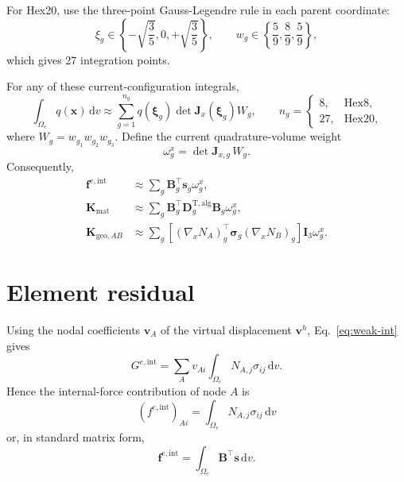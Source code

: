 \documentclass[11pt,a4paper]{article}
\newcommand{\bs}[1]{\boldsymbol{#1}}
\newcommand{\dd}{\mathrm{d}}
\newcommand{\sig}{\bs{\sigma}}
\newcommand{\vct}[1]{\mathbf{#1}}
\begin{document}
For Hex20, use the three-point Gauss-Legendre rule in each parent coordinate:
\begin{equation}
\xi_g\in\left\{-\sqrt{\frac{3}{5}},0,+\sqrt{\frac{3}{5}}\right\},
\qquad
w_g\in\left\{\frac{5}{9},\frac{8}{9},\frac{5}{9}\right\},
\end{equation}
which gives 27 integration points.

For any of these current-configuration integrals,
\begin{equation}
\int_{\Omega_e}q(\bs{x})\,\dd v
\approx
\sum_{g=1}^{n_g}
q(\bs{\xi}_g)
\det\vct{J}_x(\bs{\xi}_g)
W_g,
\qquad
n_g=\begin{cases}8,&\text{Hex8},\\27,&\text{Hex20},\end{cases}
\label{eq:quadrature}
\end{equation}
where $W_g=w_{g_1}w_{g_2}w_{g_3}$. Define the current quadrature-volume weight
\begin{equation}
\boxed{\omega_g^x=\det\vct J_{x,g}\,W_g.}
\label{eq:omega-current}
\end{equation}
Consequently,
\begin{align}
\vct f^{e,\mathrm{int}}
&\approx
\sum_g
\vct{B}_g^\top\vct{s}_g
\omega_g^x,
\label{eq:fint-quad}
\\
\vct{K}_{\mathrm{mat}}
&\approx
\sum_g
\vct{B}_g^\top\vct{D}^{\mathrm{T,alg}}_g\vct{B}_g
\omega_g^x,
\label{eq:Kmat-quad}
\\
\vct{K}_{\mathrm{geo},AB}
&\approx
\sum_g
\left[(\nabla_xN_A)_g^\top\sig_g(\nabla_xN_B)_g\right]
\vct{I}_3
\omega_g^x.
\label{eq:Kgeo-quad}
\end{align}

\section{Element residual}

Using the nodal coefficients $\vct v_A$ of the virtual displacement $\bs v^h$, Eq.~\eqref{eq:weak-int} gives
\begin{equation}
G^{e,\mathrm{int}}
=
\sum_A
v_{Ai}
\int_{\Omega_e}
N_{A,j}\sigma_{ij}\,\dd v.
\end{equation}
Hence the internal-force contribution of node $A$ is
\begin{equation}
\boxed{
(f^{e,\mathrm{int}})_{Ai}
=
\int_{\Omega_e}
N_{A,j}\sigma_{ij}\,\dd v
}
\label{eq:fint-index}
\end{equation}
or, in standard matrix form,
\begin{equation}
\boxed{
\vct f^{e,\mathrm{int}}
=
\int_{\Omega_e}
\vct{B}^\top\vct{s}\,\dd v.
}
\label{eq:fint-B}
\end{equation}
\end{document}
